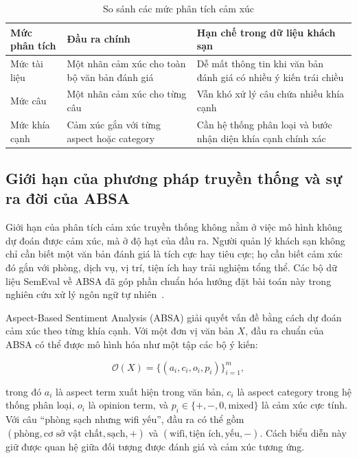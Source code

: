 \begin{table}[htbp]
\centering
\caption{So sánh các mức phân tích cảm xúc}
\label{tab:chap2-cảm xúc-levels}
\begin{tabular}{p{}p{}p{}}
\toprule
\textbf{Mức phân tích} & \textbf{Đầu ra chính} & \textbf{Hạn chế trong dữ liệu khách sạn} \\
\midrule
Mức tài liệu & Một nhãn cảm xúc cho toàn bộ văn bản đánh giá & Dễ mất thông tin khi văn bản đánh giá có nhiều ý kiến trái chiều \\
Mức câu & Một nhãn cảm xúc cho từng câu & Vẫn khó xử lý câu chứa nhiều khía cạnh \\
Mức khía cạnh & Cảm xúc gắn với từng aspect hoặc category & Cần hệ thống phân loại và bước nhận diện khía cạnh chính xác \\
\bottomrule
\end{tabular}
\end{table}

\subsection{Giới hạn của phương pháp truyền thống và sự ra đời của ABSA}
\label{subsec:chap2-absa-motivation}

Giới hạn của phân tích cảm xúc truyền thống không nằm ở việc mô hình không dự đoán được cảm xúc, mà ở độ hạt của đầu ra. Người quản lý khách sạn không chỉ cần biết một văn bản đánh giá là tích cực hay tiêu cực; họ cần biết cảm xúc đó gắn với phòng, dịch vụ, vị trí, tiện ích hay trải nghiệm tổng thể. Các bộ dữ liệu SemEval về ABSA đã góp phần chuẩn hóa hướng đặt bài toán này trong nghiên cứu xử lý ngôn ngữ tự nhiên~\cite{pontiki2014semeval,pontiki2015semeval}.

Aspect-Based Sentiment Analysis (ABSA) giải quyết vấn đề bằng cách dự đoán cảm xúc theo từng khía cạnh. Với một đơn vị văn bản $X$, đầu ra chuẩn của ABSA có thể được mô hình hóa như một tập các bộ ý kiến:

\begin{equation}
\mathcal{O}(X)=\{(a_i,c_i,o_i,p_i)\}_{i=1}^{m},
\label{eq:chap2-absa-tuples}
\end{equation}

trong đó $a_i$ là aspect term xuất hiện trong văn bản, $c_i$ là aspect category trong hệ thống phân loại, $o_i$ là opinion term, và $p_i\in\{+, -, 0, \text{mixed}\}$ là cảm xúc cực tính. Với câu ``phòng sạch nhưng wifi yếu'', đầu ra có thể gồm $(\text{phòng}, \text{cơ sở vật chất}, \text{sạch}, +)$ và $(\text{wifi}, \text{tiện ích}, \text{yếu}, -)$. Cách biểu diễn này giữ được quan hệ giữa đối tượng được đánh giá và cảm xúc tương ứng.

